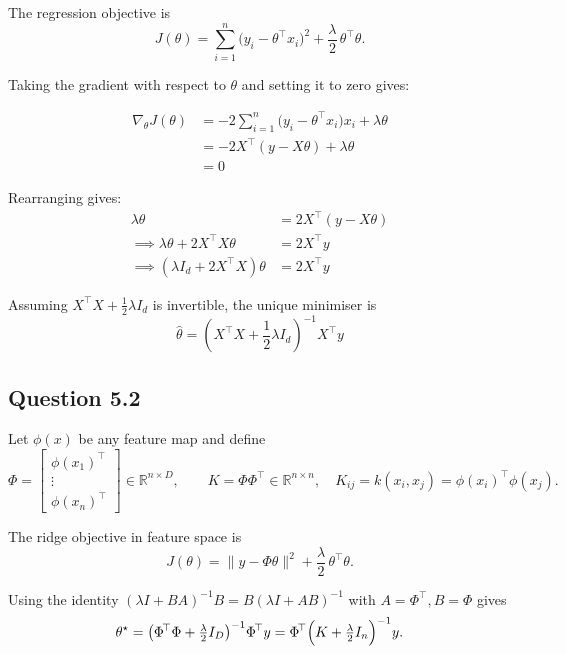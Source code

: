 \documentclass[a4paper]{article}
\begin{document}
\noindent The regression objective is
\[
J(\theta)=\sum_{i=1}^{n}\bigl(y_i-\theta^{\top}x_i\bigr)^{2}+\frac{\lambda}{2}\,\theta^{\top}\theta .
\]

\noindent Taking the gradient with respect to \(\theta\) and setting it to zero gives:

\begin{align*}
    \nabla_{\theta}J(\theta) &= -2\sum_{i=1}^{n}\bigl(y_i-\theta^{\top}x_i\bigr)x_i+\lambda\theta \\
    &= -2X^{\top}(y-X\theta)+\lambda\theta \\
    &= 0
\end{align*}

\noindent Rearranging gives:
\begin{align*}
    \lambda\theta &= 2X^{\top}(y-X\theta) \\
    \implies \lambda\theta + 2X^{\top}X\theta &= 2X^{\top}y \\
    \implies (\lambda I_{d}+2X^{\top}X)\theta &= 2X^{\top}y
\end{align*}

\noindent Assuming \(X^{\top}X+ \frac{1}{2}\lambda I_{d}\) is invertible, the unique minimiser is
\[
\hat{\theta} = \left( X^{\top}X+\frac{1}{2}\lambda I_{d} \right)^{-1} X^{\top} y
\]


\vspace{2ex}
\subsection*{Question 5.2}

\noindent
Let \(\phi(x)\) be any feature map and define  
\[
\Phi = 
\begin{bmatrix}
\phi(x_1)^{\!\top} \\[-2pt]
\vdots            \\[-2pt]
\phi(x_n)^{\!\top}
\end{bmatrix}
\in\mathbb{R}^{n\times D}, 
\qquad 
K = \Phi\Phi^{\!\top}\in\mathbb{R}^{n\times n}, 
\quad 
K_{ij}=k(x_i,x_j)=\phi(x_i)^{\!\top}\phi(x_j).
\]

\noindent The ridge objective in feature space is  
\[
J(\theta)=\lVert y-\Phi\theta\rVert^{2}+\frac{\lambda}{2}\,\theta^{\top}\theta.
\]

\noindent Using the identity \((\lambda I+BA)^{-1}B=B(\lambda I+AB)^{-1}\) with  
\(A=\Phi^{\!\top}, B=\Phi\) gives  
\[
\theta^{\star}
= \bigl(\Phi^{\!\top}\Phi+\tfrac{\lambda}{2}I_D\bigr)^{-1}\Phi^{\!\top}y
= \Phi^{\!\top}\Bigl(K+\tfrac{\lambda}{2}I_n\Bigr)^{-1}y.
\]
\end{document}
